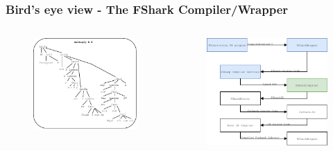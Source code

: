 \documentclass[10pt, compress, usenames, dvipsnames]{beamer}
\begin{document}
\begin{frame}[fragile]
  \frametitle{Bird's eye view - The FShark Compiler/Wrapper}
\begin{columns}[t] %
\begin{column}{.38\textwidth}
  \begin{figure}
\includegraphics[scale=0.6]{./images/multiplyAST}
  \end{figure}
\end{column}
\hfill
\begin{column}{.60\textwidth}
  \begin{figure}
    \includegraphics[scale=0.7]{./images/pipeline/pipeline5}
  \end{figure}
\end{column}
\end{columns}
\end{frame}
\end{document}
